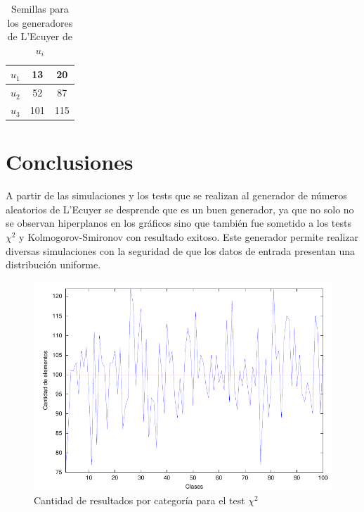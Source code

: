 \documentclass{sig-alternate}
\begin{document}
\begin{table}[h]
\label{seeds}
\centering
\begin{tabular}{|c|c|c|}
\hline
 $u_1$ & 13 & 20 \\
\hline
 $u_2$ & 52 & 87 \\
\hline
 $u_3$ & 101 & 115 \\
\hline
\end{tabular}
\caption{Semillas para los generadores de L'Ecuyer de $u_i$}
\end{table}


\section{Conclusiones}\label{conclusiones}

A partir de las simulaciones y los tests que se realizan al generador de n\'{u}meros 
aleatorios de L'Ecuyer se desprende que es un buen generador, ya que no solo no 
se observan hiperplanos en los gr\'{a}ficos sino que tambi\'{e}n fue sometido a
los tests $\chi^{2}$ y Kolmogorov-Smironov con resultado exitoso. Este generador
permite realizar diversas simulaciones con la seguridad de que los datos de
entrada presentan una distribuci\'{o}n uniforme.

\begin{figure}[hp]
\centering
\includegraphics[scale=0.8]{graficos/clases}
\caption{Cantidad de resultados por categor\'{i}a para el test $\chi^{2}$}
\label{fig:clases}
\end{figure}
\end{document}
